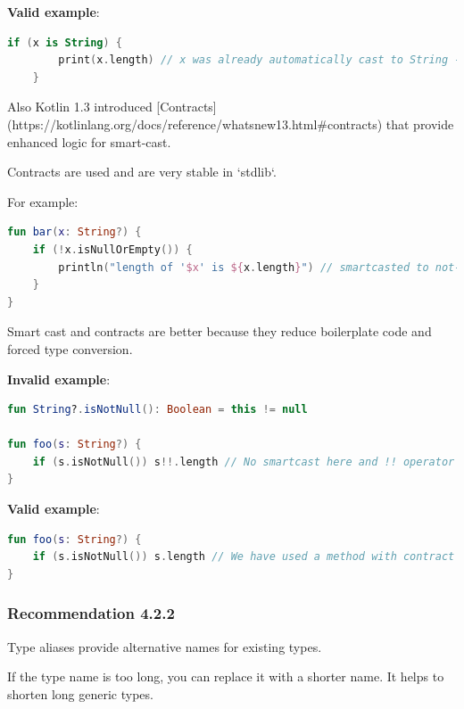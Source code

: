 {{{{\textbf{Valid example}:

\begin{lstlisting}[language=Kotlin]
    if (x is String) {
        print(x.length) // x was already automatically cast to String - no need to use 'as' keyword here
    }
\end{lstlisting}


Also Kotlin 1.3 introduced [Contracts](https://kotlinlang.org/docs/reference/whatsnew13.html\#contracts) that provide enhanced logic for smart-cast.

Contracts are used and are very stable in `stdlib`.

 

For example:



\begin{lstlisting}[language=Kotlin]
fun bar(x: String?) {
    if (!x.isNullOrEmpty()) {
        println("length of '$x' is ${x.length}") // smartcasted to not-null
    }
} 
\end{lstlisting}


Smart cast and contracts are better because they reduce boilerplate code and forced type conversion.



\textbf{Invalid example}:

\begin{lstlisting}[language=Kotlin]
fun String?.isNotNull(): Boolean = this != null

fun foo(s: String?) {
    if (s.isNotNull()) s!!.length // No smartcast here and !! operator is used
}
\end{lstlisting}


\textbf{Valid example}:

\begin{lstlisting}[language=Kotlin]
fun foo(s: String?) {
    if (s.isNotNull()) s.length // We have used a method with contract from stdlib that helped compiler to execute smart cast
}
\end{lstlisting}


\subsubsection*{\textbf{Recommendation 4.2.2}}
\leavevmode\newline



Type aliases provide alternative names for existing types.

If the type name is too long, you can replace it with a shorter name. It helps to shorten long generic types.

}}}}
